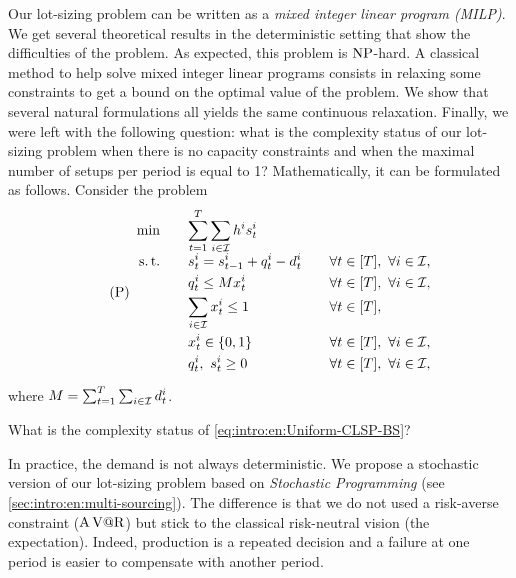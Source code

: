 Our lot-sizing problem can be written as a \emph{mixed integer linear program (MILP)}.
We get several theoretical results in the deterministic setting that show the difficulties of the problem.
As expected, this problem is $\operatorname{NP}$-hard.
A classical method to help solve mixed integer linear programs consists in relaxing some constraints to get a bound on the optimal value of the problem.
We show that several natural formulations all yields the same continuous relaxation.
Finally, we were left with the following question: what is the complexity status of our lot-sizing problem when there is no capacity constraints and when the maximal number of setups per period is equal to 1?
Mathematically, it can be formulated as follows.
Consider the problem
\begin{equation}\tag{P}\label{eq:intro:en:Uniform-CLSP-BS}
  \begin{array}{rlll}
    \min\quad & \ds \sum_{t=1}^{\horizon} \sum_{i\in\REF} \holding^i \inventory_t^i
    \\ \smallskip
    \st\quad & \ds \inventory_t^i = \inventory_{t-1}^i + \quantity_t^i - \demand_t^i && \forall t\in\range{\horizon},\ \forall i\in\REF,
    \\ \smallskip
    & \ds \quantity_t^i \le M\setup_t^i && \forall t\in\range{\horizon},\ \forall i\in\REF,
    \\ \smallskip
    & \ds \sum_{i\in\REF} \setup_t^i \le 1 && \forall t\in\range{\horizon},
    \\ \smallskip
    & \ds \setup_t^i \in \crbracket{0,1} && \forall t\in\range{\horizon},\ \forall i\in\REF,
    \\ \smallskip
    & \ds \quantity_t^i,\ \inventory_t^i \ge 0 && \forall t\in\range{\horizon},\ \forall i\in\REF,
  \end{array}
\end{equation}
where $M=\sum_{t=1}^{T} \sum_{i\in\mathcal{I}}d_t^i$.
\begin{question}
What is the complexity status of \eqref{eq:intro:en:Uniform-CLSP-BS}?
\end{question}


\medskip


In practice, the demand is not always deterministic.
We propose a stochastic version of our lot-sizing problem based on \emph{Stochastic Programming} (see \cref{sec:intro:en:multi-sourcing}).
The difference is that we do not used a risk-averse constraint ($\operatorname{A\operatorname{V@R}}$) but stick to the classical risk-neutral vision (the expectation).
Indeed, production is a repeated decision and a failure at one period is easier to compensate with another period.


